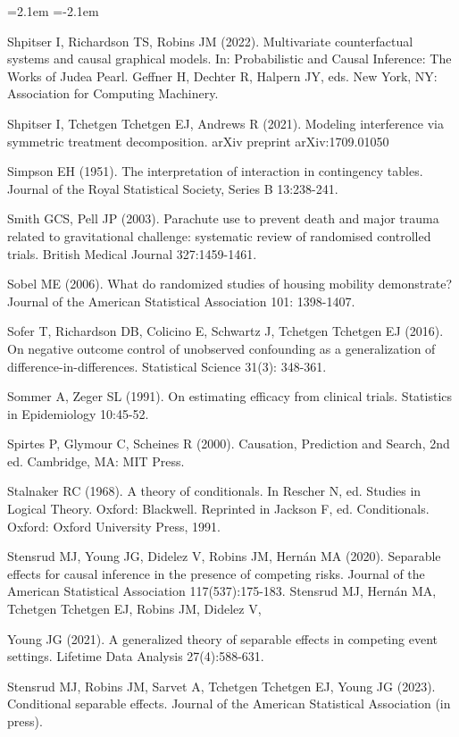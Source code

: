 \begin{list}{}{\leftmargin=2.1em   \itemindent=-2.1em \parsep=0pt \itemsep=1.6pt \topsep=4pt \rightmargin=0pt}
\item Shpitser I, Richardson TS, Robins JM (2022). Multivariate counterfactual systems and causal graphical models. In: Probabilistic and Causal Inference: The Works of Judea Pearl. Geffner H, Dechter R, Halpern JY, eds. New York, NY: Association for Computing Machinery.
\item Shpitser I, Tchetgen Tchetgen EJ, Andrews R (2021). Modeling interference via symmetric treatment decomposition. arXiv preprint arXiv:1709.01050
\item Simpson EH (1951). The interpretation of interaction in contingency tables. Journal of the Royal Statistical Society, Series B 13:238-241.
\item Smith GCS, Pell JP (2003). Parachute use to prevent death and major trauma related to gravitational challenge: systematic review of randomised controlled trials. British Medical Journal 327:1459-1461.
\item Sobel ME (2006). What do randomized studies of housing mobility demonstrate? Journal of the American Statistical Association 101: 1398-1407.
\item Sofer T, Richardson DB, Colicino E, Schwartz J, Tchetgen Tchetgen EJ (2016). On negative outcome control of unobserved confounding as a generalization of difference-in-differences. Statistical Science 31(3): 348-361.
\item Sommer A, Zeger SL (1991). On estimating efficacy from clinical trials. Statistics in Epidemiology 10:45-52.
\item Spirtes P, Glymour C, Scheines R (2000). Causation, Prediction and Search, 2nd ed. Cambridge, MA: MIT Press.
\item Stalnaker RC (1968). A theory of conditionals. In Rescher N, ed. Studies in Logical Theory. Oxford: Blackwell. Reprinted in Jackson F, ed. Conditionals. Oxford: Oxford University Press, 1991.
\item Stensrud MJ, Young JG, Didelez V, Robins JM, Hernán MA (2020). Separable effects for causal inference in the presence of competing risks. Journal of the American Statistical Association 117(537):175-183. Stensrud MJ, Hernán MA, Tchetgen Tchetgen EJ, Robins JM, Didelez V,
\item Young JG (2021). A generalized theory of separable effects in competing event settings. Lifetime Data Analysis 27(4):588-631.
\item Stensrud MJ, Robins JM, Sarvet A, Tchetgen Tchetgen EJ, Young JG (2023). Conditional separable effects. Journal of the American Statistical Association (in press).

\end{list}
